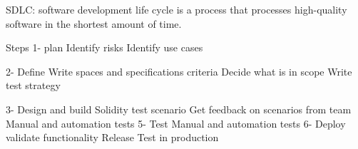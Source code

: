 SDLC:
  software development life cycle
  is a process that processes high-quality software in the shortest amount of time.

Steps 
  1- plan 
    Identify risks 
    Identify use cases 

  2- Define 
    Write spaces and specifications criteria 
    Decide what is in scope 
    Write test strategy 

  3- Design and build 
    Solidity test scenario
    Get feedback on scenarios from team  
    Manual and automation tests
  5- Test 
    Manual and automation tests
  6- Deploy
    validate functionality 
    Release 
    Test in production 
